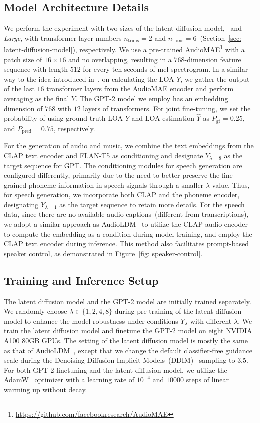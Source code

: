 \documentclass[lettersize,journal]{IEEEtran}
\begin{document}
\subsection{Model Architecture Details} 
\noindent
We perform the experiment with two sizes of the latent diffusion model, \vModelName~and \vModelName\textit{-Large}, with transformer layer numbers $n_{\text{trans}}=2$ and $n_{\text{trans}}=6$~(Section~\ref{sec: latent-diffusion-model}), respectively. We use a pre-trained AudioMAE\footnote{\url{https://github.com/facebookresearch/AudioMAE}} with a patch size of $16\times 16$ and no overlapping, resulting in a $768$-dimension feature sequence with length $512$ for every ten seconds of mel spectrogram. In a similar way to the idea introduced in~\cite{chen2023speech}, on calculating the LOA $Y$, we gather the output of the last $16$ transformer layers from the AudioMAE encoder and perform averaging as the final $Y$. The GPT-2 model we employ has an embedding dimension of $768$ with $12$ layers of transformers. For joint fine-tuning, we set the probability of using ground truth LOA $Y$ and LOA estimation $\hat{Y}$ as $P_{\text{gt}}=0.25$, and $P_{\text{pred}}=0.75$, respectively.

For the generation of audio and music, we combine the text embeddings from the CLAP text encoder and FLAN-T5 as conditioning and designate $Y_{\lambda=8}$ as the target sequence for GPT. The conditioning modules for speech generation are configured differently, primarily due to the need to better preserve the fine-grained phoneme information in speech signals through a smaller $\lambda$ value. Thus, for speech generation, we incorporate both CLAP and the phoneme encoder, designating $Y_{\lambda=1}$ as the target sequence to retain more details. For the speech data, since there are no available audio captions~(different from transcriptions), we adopt a similar approach as AudioLDM~\cite{liu2023audioldm} to utilize the CLAP audio encoder to compute the embedding as a condition during model training, and employ the CLAP text encoder during inference. This method also facilitates prompt-based speaker control, as demonstrated in Figure~\ref{fig: speaker-control}.

\subsection{Training and Inference Setup}
\noindent
The latent diffusion model and the GPT-2 model are initially trained separately. We randomly choose $\lambda\in\{1,2,4,8\}$ during pre-training of the latent diffusion model to enhance the model robustness under conditions $Y_{\lambda}$ with different $\lambda$. 
We train the latent diffusion model and finetune the GPT-2 model on eight NVIDIA A100 80GB GPUs.
The setting of the latent diffusion model is mostly the same as that of AudioLDM~\cite{liu2023audioldm}, except that we change the default classifier-free guidance scale during the Denoising Diffusion Implicit Models~(DDIM)~\cite{song2020denoising-ddim} sampling to $3.5$.
For both GPT-2 finetuning and the latent diffusion model, we utilize the AdamW~\cite{loshchilov2017decoupled} optimizer with a learning rate of $10^{-4}$ and $10000$ steps of linear warming up without decay. 
\end{document}
